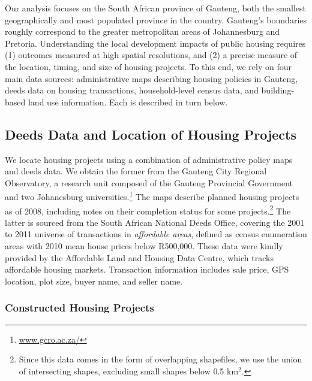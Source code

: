 \documentclass[12pt]{article}
\begin{document}
Our analysis focuses on the South African province of Gauteng, both the smallest geographically and most populated province in the country. Gauteng's boundaries roughly correspond to the greater metropolitan areas of Johannesburg and Pretoria. Understanding the local development impacts of public housing requires (1) outcomes measured at high spatial resolutions, and (2) a precise measure of the location, timing, and size of housing projects.  To this end, we rely on four main data sources: administrative maps describing housing policies in Gauteng, deeds data on housing transactions, household-level census data, and building-based land use information. Each is described in turn below.

\subsection{Deeds Data and Location of Housing Projects}

 We locate housing projects using a combination of administrative policy maps and deeds data. We obtain the former from the Gauteng City Regional Observatory, a research unit composed of the Gauteng Provincial Government and two Johanesburg universities.\footnote{\href{url}{www.gcro.ac.za/}} The maps describe planned housing projects as of 2008, including notes on their completion status for some projects.\footnote{Since this data comes in the form of overlapping shapefiles, we use the union of intersecting shapes, excluding small shapes below 0.5 km$^2$.} The latter is sourced from the South African National Deeds Office, covering the 2001 to 2011 universe of transactions in {\it affordable areas}, defined as census enumeration areas with 2010 mean house prices below R500,000. These data were kindly provided by the Affordable Land and Housing Data Centre, which tracks affordable housing markets. Transaction information includes sale price, GPS location, plot size, buyer name, and seller name.

% 

 \subsubsection*{Constructed Housing Projects}
\end{document}
